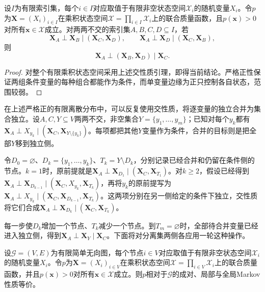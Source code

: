 \begin{lemma}[严格正分布的交性质]
  \label{lem:pgm-undirected-intersection}
  设$I$为有限索引集，每个$i\in I$对应取值于有限非空状态空间$\mathcal{X}_i$的随机变量$X_i$。令$p$为$\bm{X}=(X_i)_{i\in I}$在乘积状态空间$\mathcal{X}=\prod_{i\in I}\mathcal{X}_i$上的联合质量函数，且$p(\bm{x})>0$对所有$\bm{x}\in\mathcal{X}$成立。对两两不交的索引集$A,B,C,D\subseteq I$，若
  \[
    \bm{X}_A\perp\bm{X}_B\mid(\bm{X}_C,\bm{X}_D),
    \qquad
    \bm{X}_A\perp\bm{X}_D\mid(\bm{X}_C,\bm{X}_B),
  \]
  则
  \[
    \bm{X}_A\perp(\bm{X}_B,\bm{X}_D)\mid\bm{X}_C.
  \]
\end{lemma}

\begin{proof}
对整个有限乘积状态空间采用上述交性质引理，即得当前结论。严格正性保证两组条件变量的每种组合都能作为条件，而单变量边缘为正只控制各自状态，范围较弱。
\end{proof}

在上述严格正的有限离散分布中，可以反复使用交性质，将逐变量的独立合并为集合独立。设$A,C,Y\subseteq V$两两不交，非空集合$Y=\{y_1,\ldots,y_m\}$；已知对每个$y_k$都有$\bm{X}_A\perp X_{y_k}\mid(\bm{X}_C,\bm{X}_{Y\setminus\{y_k\}})$。每项都把其他$Y$变量作为条件，合并的目标则是把全部$Y$移到独立侧。

令$D_0=\varnothing$、$D_k=\{y_1,\ldots,y_k\}$、$T_k=Y\setminus D_k$，分别记录已经合并和仍留在条件侧的节点。$k=1$时，原前提就是$\bm{X}_A\perp\bm{X}_{D_1}\mid(\bm{X}_C,\bm{X}_{T_1})$。对$k\geq2$，假设已经得到$\bm{X}_A\perp\bm{X}_{D_{k-1}}\mid(\bm{X}_C,X_{y_k},\bm{X}_{T_k})$，再将$y_k$的原前提写为$\bm{X}_A\perp X_{y_k}\mid(\bm{X}_C,\bm{X}_{D_{k-1}},\bm{X}_{T_k})$。这两项分别在另一侧给定的条件下独立，交性质将它们合成$\bm{X}_A\perp\bm{X}_{D_k}\mid(\bm{X}_C,\bm{X}_{T_k})$。

每一步使$D_k$增加一个节点、$T_k$减少一个节点。到$T_m=\varnothing$时，全部待合并变量已经进入独立侧，得到$\bm{X}_A\perp\bm{X}_Y\mid\bm{X}_C$。下面将对分离集两侧各应用一轮这种操作。

\begin{theorem}[严格正条件下三种Markov性质等价]
  \label{thm:pgm-undirected-markov-equivalence}
  设$\mathcal{G}=(V,E)$为有限简单无向图，每个节点$i\in V$对应取值于有限非空状态空间$\mathcal{X}_i$的随机变量$X_i$。令$p$为$\bm{X}=(X_i)_{i\in V}$在乘积状态空间$\mathcal{X}=\prod_{i\in V}\mathcal{X}_i$上的联合质量函数，并且$p(\bm{x})>0$对所有$\bm{x}\in\mathcal{X}$成立。则$p$相对于$\mathcal{G}$的成对、局部与全局Markov性质等价。
\end{theorem}

